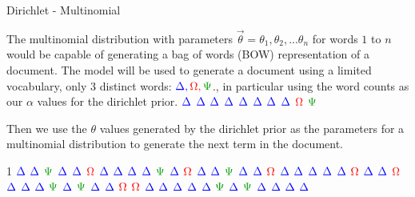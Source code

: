 \documentclass[
  ignorenonframetext,
]{beamer}
\begin{document}
\begin{frame}{Dirichlet - Multinomial}
\protect\hypertarget{dirichlet---multinomial}{}

\footnotesize

The multinomial distribution with parameters
\(\overrightarrow{\theta} = \theta_{1}, \theta_{2}, ... \theta_{n}\) for
words \(1\) to \(n\) would be capable of generating a bag of words (BOW)
representation of a document. The model will be used to generate a
document using a limited vocabulary, only 3 distinct words:
\(\color{blue} \Delta, \color{red} \Omega, \color{darkgreen} \Psi\)., in
particular using the word counts as our \(\alpha\) values for the
dirichlet prior. \(\color{blue} \Delta\) \(\color{blue} \Delta\)
\(\color{blue} \Delta\) \(\color{blue} \Delta\) \(\color{blue} \Delta\)
\(\color{blue} \Delta\) \(\color{blue} \Delta\) \(\color{blue} \Delta\)
\(\color{red} \Omega\) \(\color{darkgreen} \Psi\)

Then we use the \(\theta\) values generated by the dirichlet prior as
the parameters for a multinomial distribution to generate the next term
in the document.

1 \(\color{blue} \Delta\) \(\color{blue} \Delta\)
\(\color{darkgreen} \Psi\) \(\color{blue} \Delta\)
\(\color{blue} \Delta\) \(\color{red} \Omega\) \(\color{blue} \Delta\)
\(\color{blue} \Delta\) \(\color{blue} \Delta\) \(\color{blue} \Delta\)
 \(\color{darkgreen} \Psi\) \(\color{blue} \Delta\)
\(\color{red} \Omega\) \(\color{blue} \Delta\) \(\color{blue} \Delta\)
\(\color{darkgreen} \Psi\) \(\color{blue} \Delta\)
\(\color{blue} \Delta\) \(\color{red} \Omega\) \(\color{blue} \Delta\)
 \(\color{blue} \Delta\) \(\color{blue} \Delta\)
\(\color{blue} \Delta\) \(\color{blue} \Delta\) \(\color{red} \Omega\)
\(\color{blue} \Delta\) \(\color{blue} \Delta\) \(\color{red} \Omega\)
\(\color{blue} \Delta\) \(\color{blue} \Delta\) 
\(\color{blue} \Delta\) \(\color{darkgreen} \Psi\)
\(\color{blue} \Delta\) \(\color{darkgreen} \Psi\)
\(\color{blue} \Delta\) \(\color{blue} \Delta\) \(\color{red} \Omega\)
\(\color{red} \Omega\) \(\color{blue} \Delta\) \(\color{blue} \Delta\)
 \(\color{blue} \Delta\) \(\color{blue} \Delta\)
\(\color{blue} \Delta\) \(\color{darkgreen} \Psi\)
\(\color{blue} \Delta\) \(\color{darkgreen} \Psi\)
\(\color{blue} \Delta\) \(\color{blue} \Delta\) \(\color{blue} \Delta\)
\(\color{blue} \Delta\) \newline

\end{frame}
\end{document}
